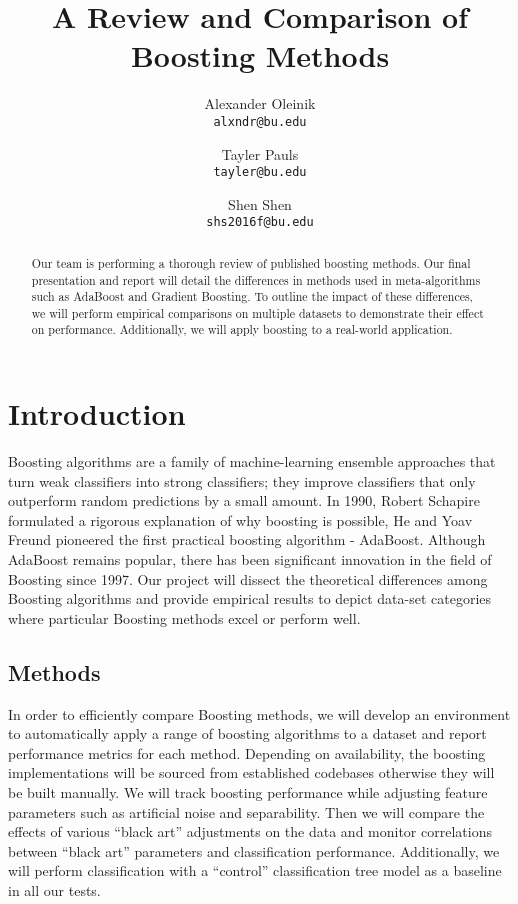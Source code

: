 \documentclass[10pt,twocolumn,letterpaper]{article}
\begin{document}
\title{A Review and Comparison of Boosting Methods}

\author{
Alexander Oleinik \\
{\tt\small alxndr@bu.edu}
\and
Tayler Pauls\\
{\tt\small tayler@bu.edu}
\and
Shen Shen\\
{\tt\small shs2016f@bu.edu}
}
\maketitle

\begin{abstract}
	Our team is performing a thorough review of published boosting methods. Our final presentation and report will detail the differences in methods used in meta-algorithms such as AdaBoost and Gradient Boosting. To outline the impact of these differences, we will perform empirical comparisons on multiple datasets to demonstrate their effect on performance. Additionally, we will apply boosting to a real-world application.
\end{abstract}

\section{Introduction}
Boosting algorithms are a family of machine-learning ensemble approaches that turn weak classifiers into strong classifiers; they improve classifiers that only outperform random predictions by a small amount. In 1990, Robert Schapire formulated a rigorous explanation of why boosting is possible, He and Yoav Freund pioneered the first practical boosting algorithm - AdaBoost. Although AdaBoost remains popular, there has been significant innovation in the field of Boosting since 1997. Our project will dissect the theoretical differences among Boosting algorithms and provide empirical results to depict data-set categories where particular Boosting methods excel or perform well. 

\subsection{Methods}

In order to efficiently compare Boosting methods, we will develop an environment to automatically apply a range of boosting algorithms to a dataset and report performance metrics for each method. Depending on availability, the boosting implementations will be sourced from established codebases otherwise they will be built manually. We will track boosting performance while adjusting feature parameters such as artificial noise and separability. Then we will compare the effects of various “black art” adjustments on the data and monitor correlations between “black art” parameters and classification performance. Additionally, we will perform classification with a “control” classification  tree model as a baseline in all our tests.
\end{document}
